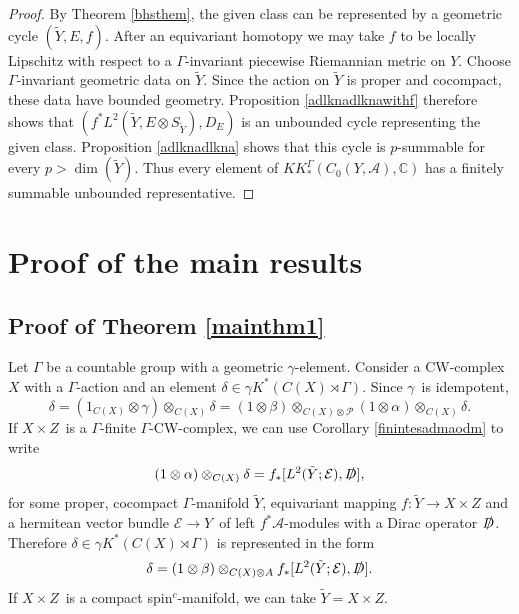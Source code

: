 \documentclass[a4paper,reqno]{amsart}
\numberwithin{equation}{section}
\def\dim{\operatorname{dim}}
\def\C{\mathbb{C}}
\theoremstyle{definition}
\theoremstyle{remark}
\begin{document}
\begin{proof}
By Theorem \ref{bhsthem}, the given class can be represented by a geometric cycle $(\widetilde Y,E,f)$. After an equivariant homotopy we may take $f$ to be locally Lipschitz with respect to a $\Gamma$-invariant piecewise Riemannian metric on $Y$. Choose $\Gamma$-invariant geometric data on $\widetilde Y$. Since the action on $\widetilde Y$ is proper and cocompact, these data have bounded geometry. Proposition \ref{adlknadlknawithf} therefore shows that $(f^*L^2(\widetilde Y,E\otimes S_{\widetilde Y}), D_E)$ is an unbounded cycle representing the given class. Proposition \ref{adlknadlkna} shows that this cycle is $p$-summable for every $p>\dim(\widetilde Y)$. Thus every element of $KK^\Gamma_*(C_0(Y,\mathcal A),\C)$ has a finitely summable unbounded representative.
\end{proof}





\section{Proof of the main results}
\label{pfsdsdsdkskn}

\subsection{Proof of Theorem \ref{mainthm1}}
\label{proofof2}




Let $\Gamma$ be a countable group with a geometric $\gamma$-element. Consider a CW-complex $X$ with a $\Gamma$-action and an element $\delta\in \gamma K^*(C(X)\rtimes \Gamma)$. Since $\gamma$ is idempotent, 
$$\delta=(1_{C(X)}\otimes \gamma)\otimes_{C(X)} \delta=(1\otimes \beta)\otimes_{C(X)\otimes \mathcal{P}}(1\otimes \alpha)\otimes_{C(X)}\delta.$$
If $X\times Z$ is a $\Gamma$-finite $\Gamma$-CW-complex, we can use Corollary \ref{finintesadmaodm} to write 
$$(1\otimes \alpha)\otimes_{C(X)}\delta=f_*[L^2(\tilde{Y};\mathcal{E}),\slashed{D}],$$ 
for some proper, cocompact $\Gamma$-manifold $\tilde{Y}$, equivariant mapping $f:\tilde{Y}\to X\times Z$ and a hermitean vector bundle $\mathcal{E}\to Y$ of left $f^*\mathcal{A}$-modules with a Dirac operator $\slashed{D}$. Therefore $\delta\in \gamma K^*(C(X)\rtimes \Gamma)$ is represented in the form
\begin{equation}
\label{lknoknadadaadaa}
\delta=(1\otimes \beta)\otimes_{C(X)\otimes A} f_*[L^2(\tilde{Y};\mathcal{E}),\slashed{D}].
\end{equation}
If $X\times Z$ is a compact spin$^c$-manifold, we can take $\tilde{Y}=X\times Z$.
\end{document}
